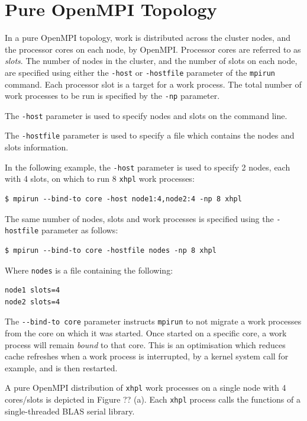 \documentclass{report}
\begin{document}
%
%
\section{Pure OpenMPI Topology}

In a pure OpenMPI topology, work is distributed across the cluster nodes, and the processor cores on each node, by OpenMPI. Processor cores are referred to as \emph{slots}. The number of nodes in the cluster, and the number of slots on each node, are specified using either the \verb|-host| or \verb|-hostfile| parameter of the \verb|mpirun| command. Each processor slot is a target for a work process. The total number of work processes to be run is specified by the \verb|-np| parameter.

The \verb|-host| parameter is used to specify nodes and slots on the command line.

The \verb|-hostfile| parameter is used to specify a file which contains the nodes and slots information.

In the following example, the \verb|-host| parameter is used to specify 2 nodes, each with 4 slots, on which to run 8 \verb|xhpl| work processes:

\lstset{style=type}
\begin{lstlisting}
$ mpirun --bind-to core -host node1:4,node2:4 -np 8 xhpl
\end{lstlisting}

The same number of nodes, slots and work processes is specified using the \verb|-hostfile| parameter as follows:

\lstset{style=type}
\begin{lstlisting}
$ mpirun --bind-to core -hostfile nodes -np 8 xhpl
\end{lstlisting}

Where \verb|nodes| is a file containing the following:

\lstset{style=listing}
\begin{lstlisting}[numbers=none, caption=nodes]
node1 slots=4
node2 slots=4
\end{lstlisting}

The \verb|--bind-to core| parameter instructs \verb|mpirun| to not migrate a work processes from the core on which it was started. Once started on a specific core, a work process will remain \emph{bound} to that core. This is an optimisation which reduces cache refreshes when a work process is interrupted, by a kernel system call for example, and is then restarted.

A pure OpenMPI distribution of \verb|xhpl| work processes on a single node with 4 cores/slots is depicted in Figure ?? (a). Each \verb|xhpl| process calls the functions of a single-threaded BLAS serial library.
\end{document}
